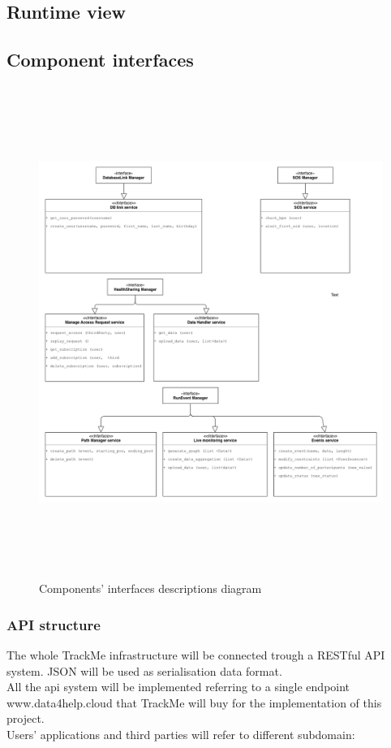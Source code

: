 \documentclass[DD.tex]{subfiles}
\begin{document}
\subsection{Runtime view}
\subsection{Component interfaces}
\begin{figure}[!th]
	\centering
	\includegraphics[height=16.00cm,keepaspectratio]{Figures/Interfaces}
	\caption{Components' interfaces descriptions diagram}
\end{figure}

\newpage

\subsubsection{API structure}
The whole TrackMe infrastructure will be connected trough a RESTful API system. JSON will be used as serialisation data format.\\
All the api system will be implemented referring to a single endpoint www.data4help.cloud that TrackMe will buy for the implementation of this project.
\\Users' applications and third parties will refer to different subdomain:
\end{document}
